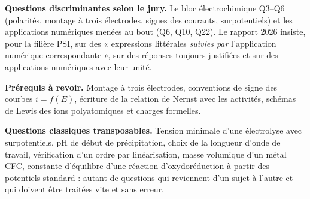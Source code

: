 \documentclass[11pt,a4paper]{article}
\begin{document}
\textbf{Questions discriminantes selon le jury.} Le bloc électrochimique Q3--Q6 (polarités, montage à trois électrodes, signes des courants, surpotentiels) et les applications numériques menées au bout (Q6, Q10, Q22). Le rapport 2026 insiste, pour la filière PSI, sur des « expressions littérales \emph{suivies par} l'application numérique correspondante », sur des réponses toujours justifiées et sur des applications numériques avec leur unité.

\textbf{Prérequis à revoir.} Montage à trois électrodes, conventions de signe des courbes \(i=f(E)\), écriture de la relation de Nernst avec les activités, schémas de Lewis des ions polyatomiques et charges formelles.

\textbf{Questions classiques transposables.} Tension minimale d'une électrolyse avec surpotentiels, pH de début de précipitation, choix de la longueur d'onde de travail, vérification d'un ordre par linéarisation, masse volumique d'un métal CFC, constante d'équilibre d'une réaction d'oxydoréduction à partir des potentiels standard : autant de questions qui reviennent d'un sujet à l'autre et qui doivent être traitées vite et sans erreur.
\end{document}
